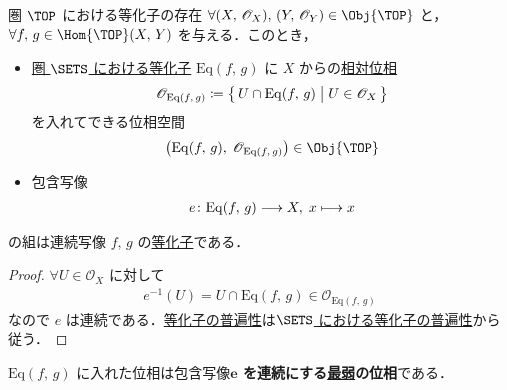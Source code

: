 \documentclass[geometry_main]{subfiles}
\begin{document}
\begin{myprop}[label=prop:equalizer-topo, breakable]{圏 $\TOP$ における等化子の存在}
	$\forall (X,\, \mathscr{O}_X),\, (Y,\, \mathscr{O}_Y) \in \Obj{\TOP}$ と，
	$\forall f,\, g \in \Hom{\TOP}(X,\, Y)$
	を与える．このとき，
	\begin{itemize}
		\item \hyperref[prop:equalizer-sets]{圏 $\SETS$ における等化子}
		$\mathrm{Eq}(f,\, g)$
		に $X$ からの\hyperref[def.reltopo]{相対位相}
		\begin{align}
			\mathscr{O}_{\mathrm{Eq}(f,\, g)} \coloneqq \bigl\{\, U \cap \mathrm{Eq}(f,\, g) \bigm| U \in \mathscr{O}_X \,\bigr\} 
		\end{align}
		を入れてできる位相空間 
		\begin{align}
			\bigl( \mathrm{Eq}(f,\, g),\; \mathscr{O}_{\mathrm{Eq}(f,\, g)} \bigr) \in \Obj{\TOP}
		\end{align}
		\item 包含写像
		\begin{align}
			e \colon \mathrm{Eq}(f,\, g) \longrightarrow X,\; x \longmapsto x
		\end{align}
	\end{itemize}
	の組は連続写像 $f,\, g$ の\hyperref[def:equalizer]{等化子}である．
\end{myprop}

\begin{proof}
	$\forall U \in \mathscr{O}_X$ に対して
	\begin{align}
		e^{-1}(U) = U \cap \mathrm{Eq}(f,\, g) \in \mathscr{O}_{\mathrm{Eq}(f,\, g)}
	\end{align}
	なので $e$ は連続である．\hyperref[def:equalizer]{等化子の普遍性}は\hyperref[prop:equalizer-sets]{$\SETS$ における等化子の普遍性}から従う．
\end{proof}

\begin{marker}\label{remark:equalizer}
	$\mathrm{Eq}(f,\, g)$ に入れた位相は包含写像\textbf{$\bm{e}$ を連続にする\hyperref[def.intensity_topo]{最弱}の位相}である．
\end{marker}
\end{document}
